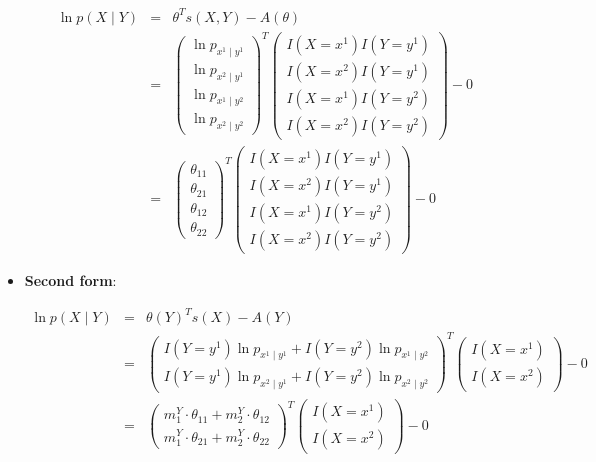 \documentclass[11pt, oneside]{article}   	%
\numberwithin{figure}{section}
\numberwithin{equation}{section}
\numberwithin{table}{section}
\theoremstyle{definition}
\begin{document}
\begin{appendices}
\begin{itemize}
\begin{eqnarray*}
\ln p(X \mid Y) &=& \theta^T s(X,Y) - A(\theta) \\
&=&
\begin{pmatrix}
\ln p_{x^1 \mid y^1}\\
\ln p_{x^2 \mid y^1}\\
\ln p_{x^1 \mid y^2}\\
\ln p_{x^2 \mid y^2}
\end{pmatrix}^T
\begin{pmatrix}
I(X=x^1)I(Y=y^1) \\
I(X=x^2)I(Y=y^1) \\
I(X=x^1)I(Y=y^2) \\
I(X=x^2)I(Y=y^2) 
\end{pmatrix}
- 0\\
&=&
\begin{pmatrix}
\theta_{11}\\
\theta_{21}\\
\theta_{12}\\
\theta_{22}
\end{pmatrix}^T
\begin{pmatrix}
I(X=x^1)I(Y=y^1) \\
I(X=x^2)I(Y=y^1) \\
I(X=x^1)I(Y=y^2) \\
I(X=x^2)I(Y=y^2) 
\end{pmatrix}
- 0
\end{eqnarray*}

\item \textbf{Second form}:

\begin{eqnarray*}
\ln p(X \mid Y) &=& \theta(Y)^Ts(X) - A(Y) \\
&=&
\begin{pmatrix}
I(Y=y^1)\ln p_{x^1 \mid y^1}  + I(Y=y^2)\ln p_{x^1 \mid y^2}\\
I(Y=y^1)\ln p_{x^2 \mid y^1}  + I(Y=y^2)\ln p_{x^2 \mid y^2}
\end{pmatrix}^T
\begin{pmatrix}
I(X=x^1) \\
I(X=x^2)
\end{pmatrix}
- 0 \\
&=&
\begin{pmatrix}
m^Y_1\cdot\theta_{11}  + m^Y_2\cdot\theta_{12}\\
m^Y_1\cdot\theta_{21}  + m^Y_2\cdot\theta_{22}
\end{pmatrix}^T
\begin{pmatrix}
I(X=x^1) \\
I(X=x^2)
\end{pmatrix}
- 0 
\end{eqnarray*}


\end{itemize}
\end{appendices}
\end{document}
